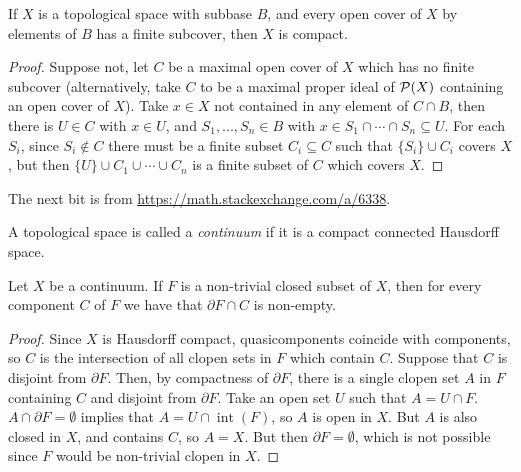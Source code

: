 \documentclass[letterpaper,11pt]{report}
\DeclareMathOperator{\inter}{int}
\begin{document}
\begin{thm}\label{alexander-subbase} If $X$ is a topological space with subbase $B$, and every open cover of $X$ by elements of $B$ has a finite subcover, then $X$ is compact.
\end{thm}
\begin{proof} Suppose not, let $C$ be a maximal open cover of $X$ which has no finite subcover (alternatively, take $C$ to be a maximal proper ideal of $\mathcal{P}(X)$ containing an open cover of $X$). Take $x \in X$ not contained in any element of $C\cap B$, then there is $U \in C$ with $x \in U$, and $S_1, ..., S_n \in B$ with $x \in S_1 \cap \cdots \cap S_n \subseteq U$. For each $S_i$, since $S_i \not\in C$ there must be a finite subset $C_i \subseteq C$ such that $\{S_i\} \cup C_i$ covers $X$, but then $\{U\} \cup C_1 \cup \cdots \cup C_n$ is a finite subset of $C$ which covers $X$.
\end{proof}

The next bit is from \url{https://math.stackexchange.com/a/6338}.

\begin{defn} A topological space is called a \emph{continuum} if it is a compact connected Hausdorff space.
\end{defn}

\begin{lem} Let $X$ be a continuum. If $F$ is a non-trivial closed subset of $X$, then for every component $C$ of $F$ we have that $\partial F \cap C$ is non-empty.
\end{lem}
\begin{proof} Since $X$ is Hausdorff compact, quasicomponents coincide with components, so $C$ is the intersection of all clopen sets in $F$ which contain $C$. Suppose that $C$ is disjoint from $\partial F$. Then, by compactness of $\partial F$, there is a single clopen set $A$ in $F$ containing $C$ and disjoint from $\partial F$. Take an open set $U$ such that $A = U \cap F$. $A \cap \partial F = \emptyset$ implies that $A = U \cap \inter(F)$, so $A$ is open in $X$. But $A$ is also closed in $X$, and contains $C$, so $A=X$. But then $\partial F = \emptyset$, which is not possible since $F$ would be non-trivial clopen in $X$.
\end{proof}
\end{document}
